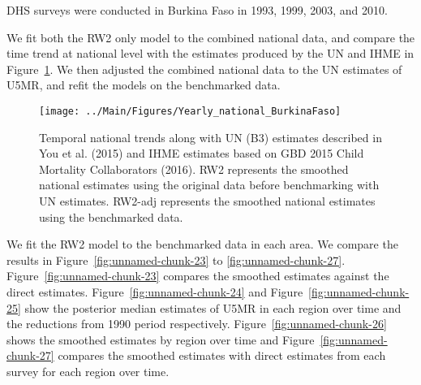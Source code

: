 \documentclass[12pt]{article}\usepackage[]{graphicx}\usepackage[]{color}
\newenvironment{knitrout}{}{} %
\begin{document}


DHS surveys were conducted in Burkina Faso in 1993, 1999, 2003, and 2010.

We fit both the RW2 only model to the combined national data, and compare the time trend at national level with the estimates produced by the UN and IHME in Figure~\ref{fig:unnamed-chunk-22}. We then adjusted the combined national data to the UN estimates of U5MR, and refit the models on the benchmarked data. 

\begin{knitrout}
\color{fgcolor}\begin{figure}[bht]

{\centering \texttt{[image: ../Main/Figures/Yearly\_national\_BurkinaFaso]} 

}

\caption[Temporal national trends along with UN (B3) estimates described in You et al]{Temporal national trends along with UN (B3) estimates described in You et al. (2015) and IHME estimates based on GBD 2015 Child Mortality Collaborators (2016). RW2 represents the smoothed national estimates using the original data before benchmarking with UN estimates. RW2-adj represents the smoothed national estimates using the benchmarked data.}\label{fig:unnamed-chunk-22}
\end{figure}


\end{knitrout}
 

We fit the RW2 model to the benchmarked data in each area. 
We compare the results in Figure~\ref{fig:unnamed-chunk-23} to \ref{fig:unnamed-chunk-27}.
Figure~\ref{fig:unnamed-chunk-23} compares the smoothed estimates against the direct estimates. Figure~\ref{fig:unnamed-chunk-24} and Figure~\ref{fig:unnamed-chunk-25} show the posterior median estimates of U5MR in each region over time and the reductions from 1990 period respectively.
Figure~\ref{fig:unnamed-chunk-26} shows the smoothed estimates by region over time and Figure~\ref{fig:unnamed-chunk-27} compares the smoothed estimates with direct estimates from each survey for each region over time.


\end{document}
